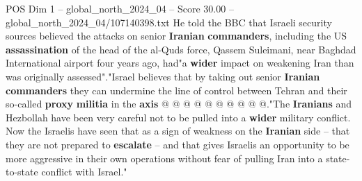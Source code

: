 \begin{textsample}{POS Dim 1 – global\_north\_2024\_04 – Score 30.00 – global\_north\_2024\_04/107140398.txt}
He told the BBC that Israeli security sources believed the attacks on senior \textbf{Iranian} \textbf{commanders}, including the US \textbf{assassination} of the head of the al-Quds force, Qassem Suleimani, near Baghdad International airport four years ago, had"a \textbf{wider} impact on weakening Iran than was originally assessed"."Israel believes that by taking out senior \textbf{Iranian} \textbf{commanders} they can undermine the line of control between Tehran and their so-called \textbf{proxy} \textbf{militia} in the \textbf{axis} @ @ @ @ @ @ @ @ @ @."The \textbf{Iranians} and Hezbollah have been very careful not to be pulled into a \textbf{wider} military conflict.
Now the Israelis have seen that as a sign of weakness on the \textbf{Iranian} side -- that they are not prepared to \textbf{escalate} -- and that gives Israelis an opportunity to be more aggressive in their own operations without fear of pulling Iran into a state-to-state conflict with Israel."

\end{textsample}
